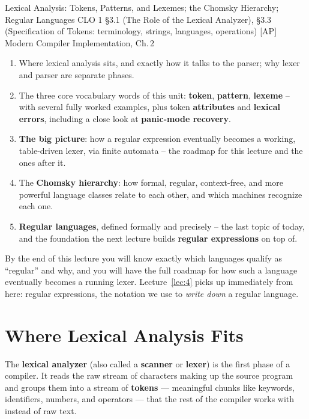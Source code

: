 \documentclass[full-course-notes.tex]{subfiles}
\begin{document}
  {Lexical Analysis: Tokens, Patterns, and Lexemes; the Chomsky Hierarchy; Regular Languages}
  {CLO 1}
  {\S3.1 (The Role of the Lexical Analyzer), \S3.3 (Specification of Tokens: terminology,
   strings, languages, operations)}
  {[AP] Modern Compiler Implementation, Ch.\,2}
\setcounter{section}{0}
\makelecturetitle

\begin{coreidea}
\begin{enumerate}
  \item Where lexical analysis sits, and exactly how it talks to the parser; why lexer and
  parser are separate phases.
  \item The three core vocabulary words of this unit: \textbf{token}, \textbf{pattern},
  \textbf{lexeme} -- with several fully worked examples, plus token \textbf{attributes} and
  \textbf{lexical errors}, including a close look at \textbf{panic-mode recovery}.
  \item \textbf{The big picture}: how a regular expression eventually becomes a working,
  table-driven lexer, via finite automata -- the roadmap for this lecture and the ones after it.
  \item The \textbf{Chomsky hierarchy}: how formal, regular, context-free, and more powerful
  language classes relate to each other, and which machines recognize each one.
  \item \textbf{Regular languages}, defined formally and precisely -- the last topic of today,
  and the foundation the next lecture builds \textbf{regular expressions} on top of.
\end{enumerate}
By the end of this lecture you will know exactly which languages qualify as ``regular'' and
why, and you will have the full roadmap for how such a language eventually becomes a running
lexer. Lecture~\ref{lec:4} picks up immediately from here: regular expressions, the notation we
use to \emph{write down} a regular language.
\end{coreidea}

\section{Where Lexical Analysis Fits}
\label{sec:l3-where-lexical-fits}

\dbtag The \textbf{lexical analyzer} (also called a \textbf{scanner} or \textbf{lexer}) is the
first phase of a compiler. It reads the raw stream of characters making up the source program
and groups them into a stream of \textbf{tokens} --- meaningful chunks like keywords,
identifiers, numbers, and operators --- that the rest of the compiler works with instead of raw
text.
\end{document}
